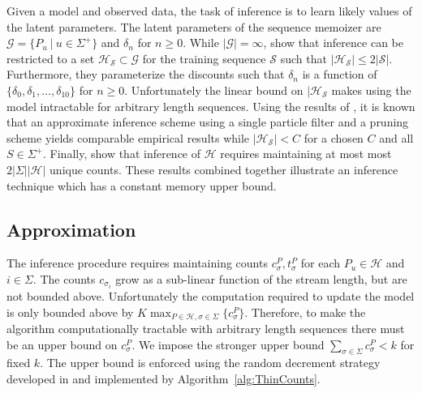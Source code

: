 Given a model and observed data,  the task of inference is to learn likely values of the latent parameters.  The latent parameters of the sequence memoizer are  $\mathcal{G} = \{P_u \ | \ u \in \Sigma^{+} \}$ and $\delta_n$ for $n \geq 0$.  While $| \mathcal{G}| = \infty$, \cite{Wood2009} show that inference can be restricted to a set $\mathcal{H_\mathcal{S}} \subset \mathcal{G}$ for the training sequence $\mathcal{S}$ such that $|\mathcal{H}_\mathcal{S} | \leq 2 |\mathcal{S}|$.  Furthermore, they parameterize the discounts such that $\delta_n$ is a function of $\{\delta_0, \delta_1, \ldots, \delta_{10} \}$ for $n \geq 0$.   Unfortunately the linear bound on $|\mathcal{H}_\mathcal{S}$ makes using the model intractable for arbitrary length sequences.  Using the results of \cite{Bartlett2010}, \cite{Gasthaus2010} it is known that an approximate inference scheme using a single particle filter and a pruning scheme yields comparable empirical results while $| \mathcal{H}_\mathcal{S}| < C$ for a chosen $C$ and all $S \in \Sigma^{+}$.  Finally, \cite{Gasthaus2011} show that inference of $\mathcal{H}$ requires maintaining at most most $2|\Sigma| |\mathcal{H}|$ unique counts.  These results combined together illustrate an inference technique which has a constant memory upper bound.

%
\subsection{Approximation}

The inference procedure requires maintaining counts $c^P_\sigma,t^P_\sigma$ for each $P_u \in \mathcal{H}$ and $i \in \Sigma$.  The counts $c_{\sigma_i}$ grow as a sub-linear function of the stream length, but are not bounded above.  Unfortunately the computation required to update the model is only bounded above by $K \max_{P \in \mathcal{H}, \sigma \in \Sigma} \{ c^P_\sigma \}$.  Therefore, to make the algorithm computationally tractable with arbitrary length sequences there must be an upper bound on $c^P_\sigma$.  We impose the stronger upper bound $\sum_{\sigma \in \Sigma} c_\sigma^P < k$ for fixed $k$.  The upper bound is enforced using the random decrement strategy developed in \cite{Bartlett2011} and implemented by Algorithm~\ref{alg:ThinCounts}.